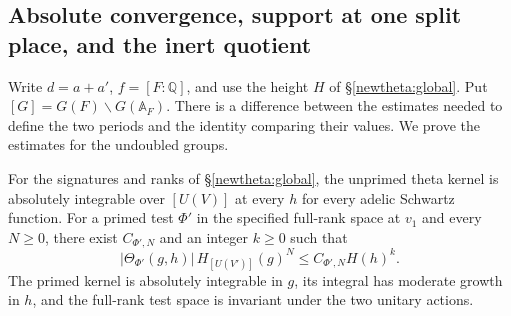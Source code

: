 \subsection{Absolute convergence, support at one split place, and the inert quotient}
\label{threal:main}

Write \(d=a+a'\), \(f=[F:\mathbb Q]\), and use the height \(H\) of
\S\ref{newtheta:global}. Put \([G]=G(F)\backslash G(\mathbb A_F)\).
There is a difference between the estimates needed to define the two
periods and the identity comparing their values. We prove the estimates
for the undoubled groups.

\begin{proposition}\label{threal:decay}
For the signatures and ranks of \S\ref{newtheta:global}, the unprimed
theta kernel is absolutely integrable over \([U(V)]\) at every \(h\)
for every adelic Schwartz function. For a primed test \(\Phi'\) in the
specified full-rank space at \(v_1\) and every \(N\geq0\), there exist
\(C_{\Phi',N}\) and an integer \(k\geq0\) such that
\[
 |\Theta_{\Phi'}(g,h)|\,H_{[U(V')]}(g)^N
                      \leq C_{\Phi',N} H(h)^k .
\]
The primed kernel is absolutely integrable in \(g\), its integral has
moderate growth in \(h\), and the full-rank test space is invariant
under the two unitary actions.
\end{proposition}
